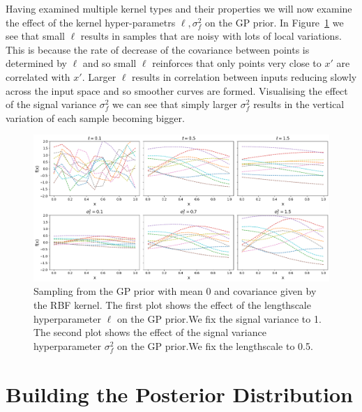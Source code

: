 \documentclass{ucdgradtaughtthesis}
\begin{document}
Having examined multiple kernel types and their properties we will now examine the effect of the kernel hyper-parametrs \(\ell,\sigma_f^2\) on the GP prior. 
In Figure~\ref{fig: GPprior_hyperparams} we see that small \(\ell\) results in samples that are noisy with lots of local variations. This is because the rate of decrease of the covariance
between points is determined by \(\ell\) and so small \(\ell\) reinforces that only points very close to \(x'\) are correlated with \(x'\).
Larger \(\ell\) results in correlation between inputs reducing slowly across the input space and so smoother curves are formed.
Visualising the effect of the signal variance \(\sigma_f^2\) we can see that simply larger \(\sigma_f^2\) results in the vertical variation of each sample becoming bigger.
%

\begin{figure}[H]
    \centering
        \includegraphics[width=\textwidth]{LatexPlots/1dplots/Kernel_hyperparams.png}
        \caption[Visualising the effect of kernel hyperparameters.]{Sampling from the GP prior with mean 0 and covariance given by the RBF kernel.
        The first plot shows the effect of the lengthscale hyperparameter \(\ell\) on the GP prior.We fix the signal variance to 1.
        The second plot shows the effect of the signal variance hyperparameter \(\sigma_f^2\) on the GP prior.We fix the lengthscale to 0.5.}
    \label{fig: GPprior_hyperparams}
\end{figure}

\section{Building the Posterior Distribution}
\label{sec: priortoposterior}
\end{document}
